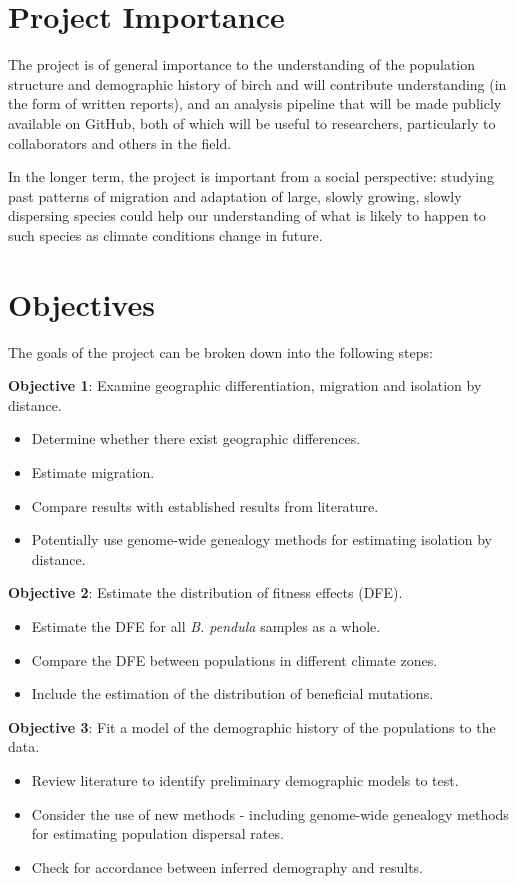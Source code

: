 \documentclass[11pt]{article}
\begin{document}
\section{Project Importance}

The project is of general importance to the understanding of the population structure and demographic history of birch and will contribute understanding (in the form of written reports), and an analysis pipeline that will be made publicly available on GitHub, both of which will be useful to researchers, particularly to collaborators and others in the field. 

In the longer term, the project is important from a social perspective: studying past patterns of migration and adaptation of large, slowly growing, slowly dispersing species could help our understanding of what is likely to happen to such species as climate conditions change in future.

\section{Objectives}

The goals of the project can be broken down into the following steps:

\textbf{Objective 1}: Examine geographic differentiation, migration and isolation by distance.
\begin{itemize}
\item Determine whether there exist geographic differences.
\item Estimate migration.
\item Compare results with established results from literature.
\item Potentially use genome-wide genealogy methods for estimating isolation by distance.
\end{itemize}

\textbf{Objective 2}: Estimate the distribution of fitness effects (DFE).
\begin{itemize}
\item Estimate the DFE for all \textit{B. pendula} samples as a whole.
\item Compare the DFE between populations in different climate zones.
\item Include the estimation of the distribution of beneficial mutations.
\end{itemize}

\textbf{Objective 3}: Fit a model of the demographic history of the populations to the data.
\begin{itemize}
\item Review literature to identify preliminary demographic models to test. 
\item Consider the use of new methods - including genome-wide genealogy methods for estimating population dispersal rates.
\item Check for accordance between inferred demography and results. 
\end{itemize}
\end{document}
